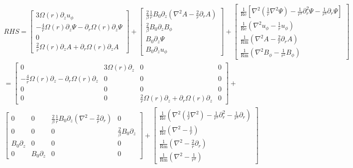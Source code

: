 \documentclass{paper}
\newcommand\reye{\mathrm{Re}}
\newcommand\reym{\mathrm{Rm}}
\begin{document}
\begin{multline}
RHS = \left[\begin{matrix}
3 \Omega(r) \partial_z u_\phi \\
-\frac{4}{r} \Omega(r)\partial_z \Psi - \partial_r \Omega(r) \partial_z \Psi \\
0 \\
\frac{2}{r} \Omega(r) \partial_z A + \partial_r \Omega(r) \partial_z A
\end{matrix}\right]
+ 
\left[\begin{matrix}
\frac{2}{\beta} \frac{1}{r} B_0 \partial_z \left(\nabla^2 A - \frac{2}{r} \partial_r A\right)\\
\frac{2}{\beta} B_0 \partial_z B_\phi \\
B_0 \partial_z \Psi\\
B_0 \partial_z u_\phi
\end{matrix}\right]
+
\left[\begin{matrix}
\frac{1}{\reye} \left[ \nabla^2 \left(\frac{1}{r} \nabla^2 \Psi\right) - \frac{1}{r^3} \partial_r^2 \Psi - \frac{1}{r^4} \partial_r \Psi\right]\\
\frac{1}{\reye} \left(\nabla^2 u_\phi - \frac{1}{r} u_\phi\right)\\
\frac{1}{\reym} \left(\nabla^2 A - \frac{2}{r} \partial_r A\right)\\
\frac{1}{\reym} \left(\nabla^2 B_\phi - \frac{1}{r^2} B_\phi\right)
\end{matrix}\right] \\
=
\left[\begin{matrix}
0 & 3\Omega(r) \partial_z & 0 & 0 \\
-\frac{4}{r} \Omega(r) \partial_z - \partial_r \Omega(r) \partial_z & 0 & 0 & 0 \\
0 & 0 & 0 & 0 \\
0 & 0 & \frac{2}{r} \Omega(r) \partial_z + \partial_r \Omega(r) \partial_z & 0
\end{matrix}\right]
+\\
\left[\begin{matrix}
0 & 0 & \frac{2}{\beta} \frac{1}{r} B_0 \partial_z \left(\nabla^2 - \frac{2}{r} \partial_r\right) & 0\\
0 & 0 & 0 & \frac{2}{\beta} B_0 \partial_z\\
B_0 \partial_z & 0 & 0 & 0 \\
0 & B_0 \partial_z & 0 & 0
\end{matrix}\right]
+ 
\left[\begin{matrix}
\frac{1}{\reye} \left(\nabla^2\left(\frac{1}{r}\nabla^2\right) - \frac{1}{r^3}\partial_r^2 - \frac{1}{r^4}\partial_r\right)\\
\frac{1}{\reye} \left(\nabla^2  - \frac{1}{r} \right)\\
\frac{1}{\reym} \left(\nabla^2 - \frac{2}{r} \partial_r \right)\\
\frac{1}{\reym} \left(\nabla^2 - \frac{1}{r^2} \right)
\end{matrix}\right]
\end{multline}
\end{document}
